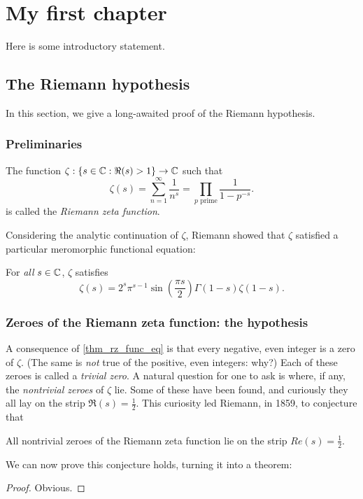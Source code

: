 \chapter{My first chapter}

Here is some introductory statement.

\section{The Riemann hypothesis}

In this section, we give a long-awaited proof of the Riemann hypothesis.

\subsection{Preliminaries}

\begin{definition}
    The function $\zeta: \{s \in \mathbb{C}: \Re(s) > 1\} \to \mathbb{C}$ such that
    \[
        \zeta(s)
        = \sum_{n = 1}^{\infty} \frac{1}{n^s}
        = \prod_{p \text{ prime}} \frac{1}{1 - p^{-s}}.
    \]
    is called the \emph{Riemann zeta function}.
\end{definition}

Considering the analytic continuation of $\zeta$, Riemann showed that $\zeta$ satisfied a particular meromorphic functional equation:

\begin{theorem}
\label{thm_rz_func_eq}
    For \emph{all} $s \in \mathbb{C}$, $\zeta$ satisfies
    \[
        \zeta(s) = 2^s \pi^{s - 1} \sin\left(\frac{\pi s}{2}\right) \Gamma(1 - s) \zeta(1 - s).
    \]
\end{theorem}

\subsection{Zeroes of the Riemann zeta function: the hypothesis}

A consequence of \cref{thm_rz_func_eq} is that every negative, even integer is a zero of $\zeta$. (The same is \emph{not} true of the positive, even integers: why?) Each of these zeroes is called a \emph{trivial zero}. A natural question for one to ask is where, if any, the \emph{nontrivial zeroes} of $\zeta$ lie. Some of these have been found, and curiously they all lay on the strip $\Re(s) = \frac{1}{2}$. This curiosity led Riemann, in 1859, to conjecture that

\begin{block}
    \begin{conjecture}[Riemann, 1859]
        All nontrivial zeroes of the Riemann zeta function lie on the strip $Re(s) = \frac{1}{2}$.
    \end{conjecture}
\end{block}

We can now prove this conjecture holds, turning it into a theorem:

\begin{proof}
    Obvious.
\end{proof}
